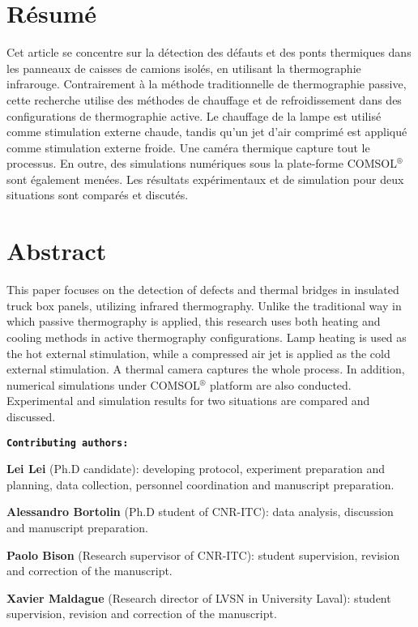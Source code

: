 \section*{Résumé}
Cet article se concentre sur la détection des défauts et des ponts thermiques dans les panneaux de caisses de camions isolés, en utilisant la thermographie infrarouge. Contrairement à la méthode traditionnelle de thermographie passive, cette recherche utilise des méthodes de chauffage et de refroidissement dans des configurations de thermographie active. Le chauffage de la lampe est utilisé comme stimulation externe chaude, tandis qu'un jet d'air comprimé est appliqué comme stimulation externe froide. Une caméra thermique capture tout le processus. En outre, des simulations numériques sous la plate-forme COMSOL$^®$ sont également menées. Les résultats expérimentaux et de simulation pour deux situations sont comparés et discutés.

\section*{Abstract}
This paper focuses on the detection of defects and thermal bridges in insulated truck box panels, utilizing infrared thermography. Unlike the traditional way in which passive thermography is applied, this research uses both heating and cooling methods in active thermography configurations. Lamp heating is used as the hot external stimulation, while a compressed air jet is applied as the cold external stimulation. A thermal camera captures the whole process. In addition, numerical simulations under COMSOL$^®$ platform are also conducted. Experimental and simulation results for two situations are compared and discussed.

\textbf{\texttt{Contributing authors:}}

\textbf{\textsf{Lei Lei}} (Ph.D candidate): developing protocol, experiment preparation and planning, data collection, personnel coordination and manuscript preparation.

\textbf{Alessandro Bortolin} (Ph.D student of CNR-ITC): data analysis, discussion and manuscript preparation.

\textbf{Paolo Bison} (Research supervisor of CNR-ITC): student supervision, revision and correction of the manuscript. 

\textbf{Xavier Maldague} (Research director of LVSN in University Laval): student supervision, revision and correction of the manuscript. 


